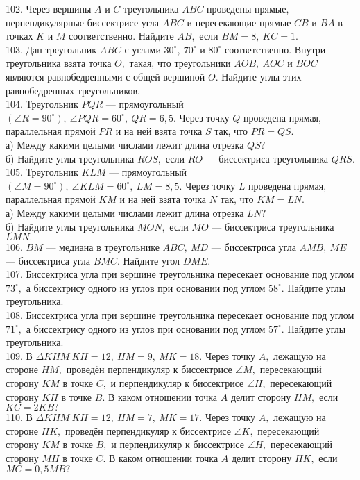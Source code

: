 102. Через вершины $A$ и $C$ треугольника $ABC$ проведены прямые, перпендикулярные биссектрисе угла $ABC$ и пересекающие прямые $CB$ и $BA$ в точках $K$ и $M$ соответственно. Найдите $AB,$ если $BM=8,\ KC=1.$\\
103. Дан треугольник $ABC$ с углами $30^\circ,\ 70^\circ$ и $80^\circ$ соответственно. Внутри треугольника взята точка $O,$ такая, что треугольники $AOB,\ AOC$ и $BOC$ являются равнобедренными с общей вершиной $O.$ Найдите углы этих равнобедренных треугольников.\\
104. Треугольник $PQR$ --- прямоугольный $(\angle R=90^\circ),\ \angle PQR=60^\circ,\ QR=6,5.$ Через точку $Q$ проведена прямая, параллельная прямой $PR$ и на ней взята точка $S$ так, что $PR=QS.$\\
а) Между какими целыми числами лежит длина отрезка $QS?$\\
б) Найдите углы треугольника $ROS,$ если $RO$ --- биссектриса треугольника $QRS.$\\
105. Треугольник $KLM$ --- прямоугольный $(\angle M=90^\circ),\ \angle KLM=60^\circ,\ LM=8,5.$ Через точку $L$ проведена прямая, параллельная прямой $KM$ и на ней взята точка $N$ так, что $KM=LN.$\\
а) Между какими целыми числами лежит длина отрезка $LN?$\\
б) Найдите углы треугольника $MON,$ если $MO$ --- биссектриса треугольника $LMN.$\\
106. $BM$ --- медиана в треугольнике $ABC,\ MD$ --- биссектриса угла $AMB,\ ME$ --- биссектриса угла $BMC.$ Найдите угол $DME.$\\
107. Биссектриса угла при вершине треугольника пересекает основание под углом $73^\circ,$ а биссектрису одного из углов при основании под углом $58^\circ.$ Найдите углы треугольника.\\
108. Биссектриса угла при вершине треугольника пересекает основание под углом $71^\circ,$ а биссектрису одного из углов при основании под углом $57^\circ.$ Найдите углы треугольника.\\
109. В $\Delta KHM\ KH=12,\ HM=9,\ MK=18.$ Через точку $A,$ лежащую на стороне $HM,$ проведён перпендикуляр к биссектрисе $\angle M,$ пересекающий сторону $KM$ в точке $C,$ и перпендикуляр к биссектрисе $\angle H,$ пересекающий сторону $KH$ в точке $B.$ В каком отношении точка $A$ делит сторону $HM,$ если $KC=2KB?$\\
110. В $\Delta KHM\ KH=12,\ HM=7,\ MK=17.$ Через точку $A,$ лежащую на стороне $HK,$ проведён перпендикуляр к биссектрисе $\angle K,$ пересекающий сторону $KM$ в точке $B,$ и перпендикуляр к биссектрисе $\angle H,$ пересекающий сторону $MH$ в точке $C.$ В каком отношении точка $A$ делит сторону $HK,$ если $MC=0,5MB?$\\
